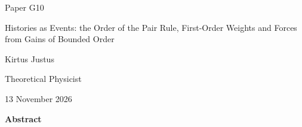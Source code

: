 \documentclass[11pt,a4paper]{article}
\begin{document}
\begin{titlepage}
{\small\sffamily \ProgramTitle\hfill Paper G10\par}
\vspace*{8mm}
{\LARGE\bfseries\raggedright{} Histories as Events: the Order of the Pair Rule, First-Order Weights and Forces from Gains of Bounded Order\par}
\vspace{9mm}
{\large Kirtus Justus\par}
\vspace{1mm}
Theoretical Physicist\par
\AuthorLocation\par
\vspace{2mm}
13 November 2026\par
\vspace{8mm}
\textbf{Abstract}\par

\end{titlepage}
\end{document}
